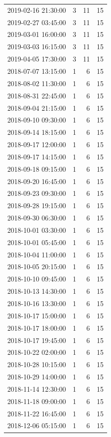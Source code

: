 \begin{tabular}{lrrr}
2019-02-16 21:30:00 & 3 & 11 & 15 \\
2019-02-27 03:45:00 & 3 & 11 & 15 \\
2019-03-01 16:00:00 & 3 & 11 & 15 \\
2019-03-03 16:15:00 & 3 & 11 & 15 \\
2019-04-05 17:30:00 & 3 & 11 & 15 \\
2018-07-07 13:15:00 & 1 & 6 & 15 \\
2018-08-02 11:30:00 & 1 & 6 & 15 \\
2018-08-31 22:45:00 & 1 & 6 & 15 \\
2018-09-04 21:15:00 & 1 & 6 & 15 \\
2018-09-10 09:30:00 & 1 & 6 & 15 \\
2018-09-14 18:15:00 & 1 & 6 & 15 \\
2018-09-17 12:00:00 & 1 & 6 & 15 \\
2018-09-17 14:15:00 & 1 & 6 & 15 \\
2018-09-18 09:15:00 & 1 & 6 & 15 \\
2018-09-20 16:45:00 & 1 & 6 & 15 \\
2018-09-23 09:30:00 & 1 & 6 & 15 \\
2018-09-28 19:15:00 & 1 & 6 & 15 \\
2018-09-30 06:30:00 & 1 & 6 & 15 \\
2018-10-01 03:30:00 & 1 & 6 & 15 \\
2018-10-01 05:45:00 & 1 & 6 & 15 \\
2018-10-04 11:00:00 & 1 & 6 & 15 \\
2018-10-05 20:15:00 & 1 & 6 & 15 \\
2018-10-10 09:45:00 & 1 & 6 & 15 \\
2018-10-13 14:30:00 & 1 & 6 & 15 \\
2018-10-16 13:30:00 & 1 & 6 & 15 \\
2018-10-17 15:00:00 & 1 & 6 & 15 \\
2018-10-17 18:00:00 & 1 & 6 & 15 \\
2018-10-17 19:45:00 & 1 & 6 & 15 \\
2018-10-22 02:00:00 & 1 & 6 & 15 \\
2018-10-28 10:15:00 & 1 & 6 & 15 \\
2018-10-29 14:00:00 & 1 & 6 & 15 \\
2018-11-14 12:30:00 & 1 & 6 & 15 \\
2018-11-18 09:00:00 & 1 & 6 & 15 \\
2018-11-22 16:45:00 & 1 & 6 & 15 \\
2018-12-06 05:15:00 & 1 & 6 & 15 \\

\end{tabular}

